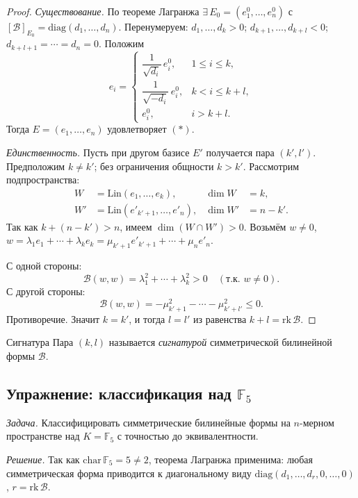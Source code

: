 \begin{proof}
	\textit{Существование.}
	По теореме Лагранжа $\exists\, E_0 = (e^0_1,\ldots,e^0_n)$ с $[\mathcal{B}]_{E_0} = \mathrm{diag}(d_1,\ldots,d_n)$.
	Перенумеруем: $d_1,\ldots,d_k > 0$;\; $d_{k+1},\ldots,d_{k+l} < 0$;\; $d_{k+l+1} = \cdots = d_n = 0$.
	Положим
	\[
	e_i = \begin{cases}
		\dfrac{1}{\sqrt{d_i}}\,e^0_i, & 1 \leq i \leq k, \\[5pt]
		\dfrac{1}{\sqrt{-d_i}}\,e^0_i, & k < i \leq k+l, \\[5pt]
		e^0_i, & i > k+l.
	\end{cases}
	\]
	Тогда $E = (e_1,\ldots,e_n)$ удовлетворяет $(*)$.
	
	\textit{Единственность.}
	Пусть при другом базисе $E'$ получается пара $(k', l')$.
	Предположим $k \neq k'$; без ограничения общности $k > k'$.
	Рассмотрим подпространства:
	\begin{align*}
		W  &= \mathrm{Lin}(e_1,\ldots,e_k), &\dim W  &= k, \\
		W' &= \mathrm{Lin}(e'_{k'+1},\ldots,e'_n), &\dim W' &= n-k'.
	\end{align*}
	Так как $k + (n-k') > n$, имеем $\dim(W \cap W') > 0$.
	Возьмём $w \neq 0$,\; $w = \lambda_1 e_1 + \cdots + \lambda_k e_k = \mu_{k'+1}e'_{k'+1} + \cdots + \mu_n e'_n$.
	
	С одной стороны:
	\[
	\mathcal{B}(w,w) = \lambda_1^2 + \cdots + \lambda_k^2 > 0 \quad (\text{т.к.\ } w \neq 0).
	\]
	С другой стороны:
	\[
	\mathcal{B}(w,w) = -\mu_{k'+1}^2 - \cdots - \mu_{k'+l'}^2 \leq 0.
	\]
	Противоречие. Значит $k = k'$, и тогда $l = l'$ из равенства $k + l = \mathrm{rk}\,\mathcal{B}$.
\end{proof}

\begin{Definition}{Сигнатура}{}
	Пара $(k,l)$ называется \textit{сигнатурой} симметрической билинейной формы $\mathcal{B}$.
\end{Definition}

\subsection{Упражнение: классификация над $\mathbb{F}_5$}

\textit{Задача.} Классифицировать симметрические билинейные формы на $n$-мерном пространстве над $K = \mathbb{F}_5$ с точностью до эквивалентности.

\textit{Решение.} Так как $\mathrm{char}\,\mathbb{F}_5 = 5 \neq 2$, теорема Лагранжа применима: любая симметрическая форма приводится к диагональному виду $\mathrm{diag}(d_1,\ldots,d_r,0,\ldots,0)$, $r = \mathrm{rk}\,\mathcal{B}$.

